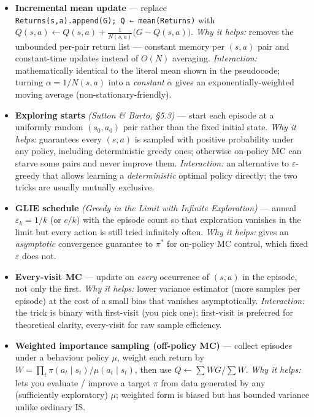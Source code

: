 \documentclass[11pt]{article}
\begin{document}
\begin{itemize}
\item
  \label{trick-2-1-1}\textbf{Incremental mean update} ---
  replace \texttt{Returns(s,a).append(G);\ Q\ ←\ mean(Returns)} with
  \(Q(s,a)\leftarrow Q(s,a) + \frac{1}{N(s,a)}\bigl(G - Q(s,a)\bigr)\).
  \emph{Why it helps:} removes the unbounded per-pair return list ---
  constant memory per \((s,a)\) pair and constant-time updates instead
  of \(O(N)\) averaging. \emph{Interaction:} mathematically identical to
  the literal mean shown in the pseudocode; turning
  \(\alpha = 1/N(s,a)\) into a \emph{constant} \(\alpha\) gives an
  exponentially-weighted moving average (non-stationary-friendly).
\item
  \label{trick-2-1-2}\textbf{Exploring starts}
  \emph{(Sutton \& Barto, §5.3)} --- start each episode at a uniformly
  random \((s_0, a_0)\) pair rather than the fixed initial state.
  \emph{Why it helps:} guarantees every \((s,a)\) is sampled with
  positive probability under any policy, including deterministic greedy
  ones; otherwise on-policy MC can starve some pairs and never improve
  them. \emph{Interaction:} an alternative to \(\varepsilon\)-greedy
  that allows learning a \emph{deterministic} optimal policy directly;
  the two tricks are usually mutually exclusive.
\item
  \label{trick-2-1-3}\textbf{GLIE schedule} \emph{(Greedy
  in the Limit with Infinite Exploration)} --- anneal
  \(\varepsilon_k = 1/k\) (or \(c/k\)) with the episode count so that
  exploration vanishes in the limit but every action is still tried
  infinitely often. \emph{Why it helps:} gives an \emph{asymptotic}
  convergence guarantee to \(\pi^*\) for on-policy MC control, which
  fixed \(\varepsilon\) does not.
\item
  \label{trick-2-1-4}\textbf{Every-visit MC} --- update
  on \emph{every} occurrence of \((s,a)\) in the episode, not only the
  first. \emph{Why it helps:} lower variance estimator (more samples per
  episode) at the cost of a small bias that vanishes asymptotically.
  \emph{Interaction:} the trick is binary with first-visit (you pick
  one); first-visit is preferred for theoretical clarity, every-visit
  for raw sample efficiency.
\item
  \label{trick-2-1-5}\textbf{Weighted importance sampling
  (off-policy MC)} --- collect episodes under a behaviour policy
  \(\mu\), weight each return by
  \(W=\prod_t \pi(a_t\mid s_t)/\mu(a_t\mid s_t)\), then use
  \(Q\leftarrow \sum WG / \sum W\). \emph{Why it helps:} lets you
  evaluate / improve a target \(\pi\) from data generated by any
  (sufficiently exploratory) \(\mu\); weighted form is biased but has
  bounded variance unlike ordinary IS.
\end{itemize}
\end{document}
